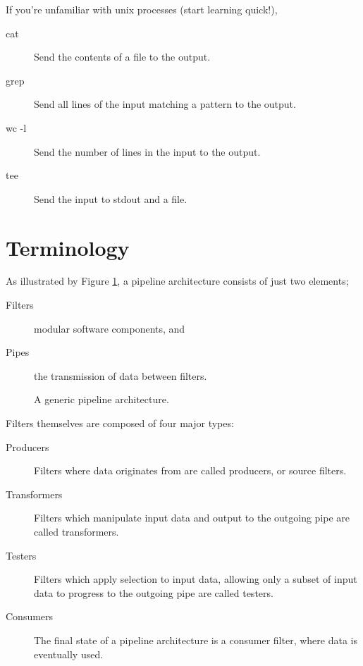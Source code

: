\noindent
If you're unfamiliar with unix processes (start learning quick!),
\begin{description}
    \item[cat] Send the contents of a file to the output.
    \item[grep] Send all lines of the input matching a pattern to the output.
    \item[wc -l] Send the number of lines in the input to the output.
    \item[tee] Send the input to stdout and a file.
\end{description}

\section{Terminology}

As illustrated by Figure \ref{fig:pipe-filter}, a pipeline architecture consists of just two elements;

\begin{description}
    \item[Filters] modular software components, and
    \item[Pipes] the transmission of data between filters.   
\end{description}

\begin{figure}[ht]
    \centering
{}
\caption{A generic pipeline architecture.}
\label{fig:pipe-filter}
\end{figure}

\noindent Filters themselves are composed of four major types:

\begin{description}
    \item[Producers] Filters where data originates from are called producers, or source filters.
    \item[Transformers] Filters which manipulate input data and output to the outgoing pipe are called transformers.
    \item[Testers] Filters which apply selection to input data, allowing only a subset of input data to progress to the outgoing pipe are called testers.
    \item[Consumers] The final state of a pipeline architecture is a consumer filter, where data is eventually used.
\end{description}

